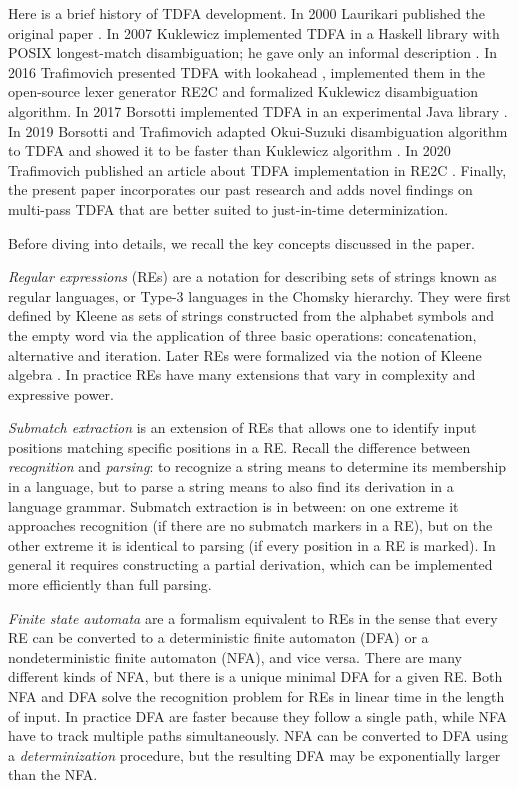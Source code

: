 \documentclass[]{article}
\begin{document}
%
Here is a brief history of TDFA development.
In 2000 Laurikari published the original paper \cite{Lau00}.
In 2007 Kuklewicz implemented TDFA in a Haskell library with POSIX longest-match disambiguation;
he gave only an informal description \cite{Kuk07}.
In 2016 Trafimovich presented TDFA with lookahead \cite{Tro17},
implemented them in the open-source lexer generator RE2C \cite{RE2C}
and formalized Kuklewicz disambiguation algorithm.
In 2017 Borsotti implemented TDFA in an experimental Java library \cite{RE2CJava}.
In 2019 Borsotti and Trafimovich adapted Okui-Suzuki disambiguation algorithm to TDFA
and showed it to be faster than Kuklewicz algorithm \cite{BorTro19}.
In 2020 Trafimovich published an article about TDFA implementation in RE2C \cite{Tro20}.
%
Finally, the present paper incorporates our past research
and adds novel findings on multi-pass TDFA that are better suited to just-in-time determinization.
\medskip

Before diving into details, we recall the key concepts discussed in the paper.
\medskip

\emph{Regular expressions} (REs) are a notation for describing sets of strings known as regular languages, or Type-3 languages in the Chomsky hierarchy.
They were first defined by Kleene \cite{Kle51} as sets of strings constructed from the alphabet symbols and the empty word via the application of three basic operations: concatenation, alternative and iteration.
Later REs were formalized via the notion of Kleene algebra \cite{Koz94}.
In practice REs have many extensions that vary in complexity and expressive power.
\medskip

\emph{Submatch extraction} is an extension of REs that allows one to
identify input positions matching specific positions in a RE.
Recall the difference between \emph{recognition} and \emph{parsing}:
to recognize a string means to determine its membership in a language,
but to parse a string means to also find its derivation in a language grammar.
Submatch extraction is in between:
on one extreme it approaches recognition (if there are no submatch markers in a RE),
but on the other extreme it is identical to parsing (if every position in a RE is marked).
In general it requires constructing a partial derivation,
which can be implemented more efficiently than full parsing.
\medskip

\emph{Finite state automata} are a formalism equivalent to REs
in the sense that every RE can be converted to a deterministic finite automaton (DFA)
or a nondeterministic finite automaton (NFA), and vice versa.
There are many different kinds of NFA, but there is a unique minimal DFA for a given RE.
Both NFA and DFA solve the recognition problem for REs in linear time in the length of input.
In practice DFA are faster because they follow a single path,
while NFA have to track multiple paths simultaneously.
NFA can be converted to DFA using a \emph{determinization} procedure,
but the resulting DFA may be exponentially larger than the NFA.
\medskip
\end{document}
